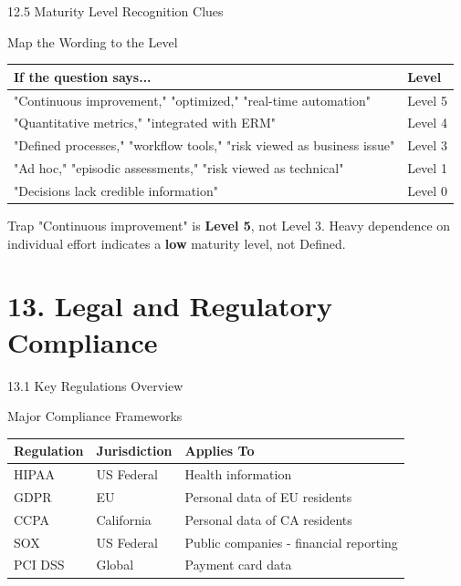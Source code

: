 \documentclass{beamer}
\begin{document}
	\begin{frame}{12.5 Maturity Level Recognition Clues}
		\begin{block}{Map the Wording to the Level}
			\begin{tabular}{|p{6cm}|p{2.5cm}|}
				\hline
				\textbf{If the question says...} & \textbf{Level} \\
				\hline
				"Continuous improvement," "optimized," "real-time automation" & Level 5 \\
				\hline
				"Quantitative metrics," "integrated with ERM" & Level 4 \\
				\hline
				"Defined processes," "workflow tools," "risk viewed as business issue" & Level 3 \\
				\hline
				"Ad hoc," "episodic assessments," "risk viewed as technical" & Level 1 \\
				\hline
				"Decisions lack credible information" & Level 0 \\
				\hline
			\end{tabular}
		\end{block}
		
		\begin{alertblock}{Trap}
			"Continuous improvement" is \textbf{Level 5}, not Level 3. Heavy dependence on individual effort indicates a \textbf{low} maturity level, not Defined.
		\end{alertblock}
	\end{frame}
	
	\section{13. Legal and Regulatory Compliance}
	
	\begin{frame}{13.1 Key Regulations Overview}
		\begin{block}{Major Compliance Frameworks}
			\begin{tabular}{|p{2.5cm}|p{4cm}|p{4.5cm}|}
				\hline
				\textbf{Regulation} & \textbf{Jurisdiction} & \textbf{Applies To} \\
				\hline
				HIPAA & US Federal & Health information \\
				\hline
				GDPR & EU & Personal data of EU residents \\
				\hline
				CCPA & California & Personal data of CA residents \\
				\hline
				SOX & US Federal & Public companies - financial reporting \\
				\hline
				PCI DSS & Global & Payment card data \\
				\hline
			\end{tabular}
		\end{block}
	\end{frame}
	
\end{document}
